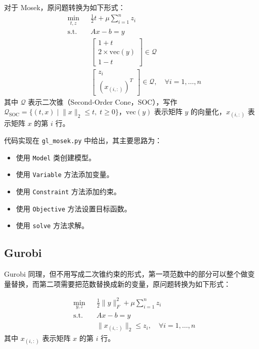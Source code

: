\documentclass[journal, a4paper]{IEEEtran}
\begin{document}
对于 Mosek，原问题转换为如下形式：
\begin{align*}
    & \underset{t, z}{\min} & & \frac{1}{2} t + \mu \sum_{i=1}^{n} z_i \\
    & \text{s.t.} & & Ax - b = y \\
    & & & \begin{bmatrix}
        1 + t \\
        2 \times \text{vec}(y) \\
        1 - t
    \end{bmatrix} \in \mathcal{Q} \\
    & & & \begin{bmatrix}
        z_i \\
        (x_{(i,:)})^T
    \end{bmatrix} \in \mathcal{Q}, \quad \forall i = 1, \ldots, n
\end{align*}
其中 $\mathcal{Q}$ 表示二次锥（Second-Order Cone，SOC），写作$\mathcal{Q}_{\text{SOC}} = \{(t, x) \mid \lVert x \rVert_2 \leq t, \; t \geq 0\}$，$\text{vec}(y)$ 表示矩阵 $y$ 的向量化，$x_{(i,:)}$ 表示矩阵 $x$ 的第 $i$ 行。

代码实现在 \texttt{gl\_mosek.py} 中给出，其主要思路为：
\begin{itemize}
    \item 使用 \texttt{Model} 类创建模型。
    \item 使用 \texttt{Variable} 方法添加变量。
    \item 使用 \texttt{Constraint} 方法添加约束。
    \item 使用 \texttt{Objective} 方法设置目标函数。
    \item 使用 \texttt{solve} 方法求解。
\end{itemize}

\subsection{\textbf{Gurobi}}
Gurobi 同理，但不用写成二次锥约束的形式，第一项范数中的部分可以整个做变量替换，而第二项需要把范数替换成新的变量，原问题转换为如下形式：

\begin{align*}
    & \underset{y, z}{\min} & & \frac{1}{2} \|y\|_F^2 + \mu \sum_{i=1}^{n} z_i \\
    & \text{s.t.} & & Ax - b = y \\
    & & & \|x_{(i, : )}\|_2 \leq z_i, \quad \forall i = 1, \ldots, n
\end{align*}
其中 $x_{(i,:)}$ 表示矩阵 $x$ 的第 $i$ 行。
\end{document}
